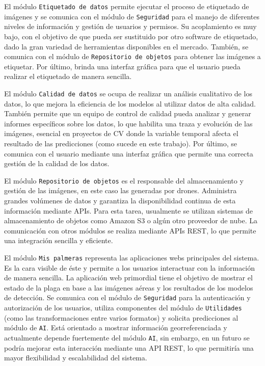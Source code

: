 El módulo \texttt{Etiquetado de datos} permite ejecutar el proceso de etiquetado de imágenes y se comunica con el módulo de \texttt{Seguridad} para el manejo de diferentes niveles de información y gestión de usuarios y permisos. Su acoplamiento es muy bajo, con el objetivo de que pueda ser sustituido por otro software de etiquetado, dado la gran variedad de herramientas disponibles en el mercado. También, se comunica con el módulo de \texttt{Repositorio de objetos} para obtener las imágenes a etiquetar. Por último, brinda una interfaz gráfica para que el usuario pueda realizar el etiquetado de manera sencilla.

El módulo \texttt{Calidad de datos} se ocupa de realizar un análisis cualitativo de los datos, lo que mejora la eficiencia de los modelos al utilizar datos de alta calidad. También permite que un equipo de control de calidad pueda analizar y generar informes específicos sobre los datos, lo que habilita una traza y evolución de las imágenes, esencial en proyectos de CV donde la variable temporal afecta el resultado de las predicciones (como sucede en este trabajo). Por último, se comunica con el usuario mediante una interfaz gráfica que permite una correcta gestión de la calidad de los datos.

El módulo \texttt{Repositorio de objetos} es el responsable del almacenamiento y gestión de las imágenes, en este caso las generadas por drones. Administra grandes volúmenes de datos y garantiza la disponibilidad continua de esta información mediante APIs. Para esta tarea, usualmente se utilizan sistemas de almacenamiento de objetos como Amazon S3 \citep{amazon_web_services_aws_nodate} o algún otro proveedor de nube. La comunicación con otros módulos se realiza mediante APIs REST, lo que permite una integración sencilla y eficiente.

El módulo \texttt{Mis palmeras} representa las aplicaciones webs principales del sistema. Es la cara visible de éste y permite a los usuarios interactuar con la información de manera sencilla. La aplicación web primordial tiene el objetivo de mostrar el estado de la plaga en base a las imágenes aéreas y los resultados de los modelos de detección. Se comunica con el módulo de \texttt{Seguridad} para la autenticación y autorización de los usuarios, utiliza componentes del módulo de \texttt{Utilidades} (como las transformaciones entre varios formatos) y solicita predicciones al módulo de \texttt{AI}. Está orientado a mostrar información georreferenciada y actualmente depende fuertemente del módulo \texttt{AI}, sin embargo, en un futuro se podría mejorar esta interacción mediante una API REST, lo que permitiría una mayor flexibilidad y escalabilidad del sistema.

